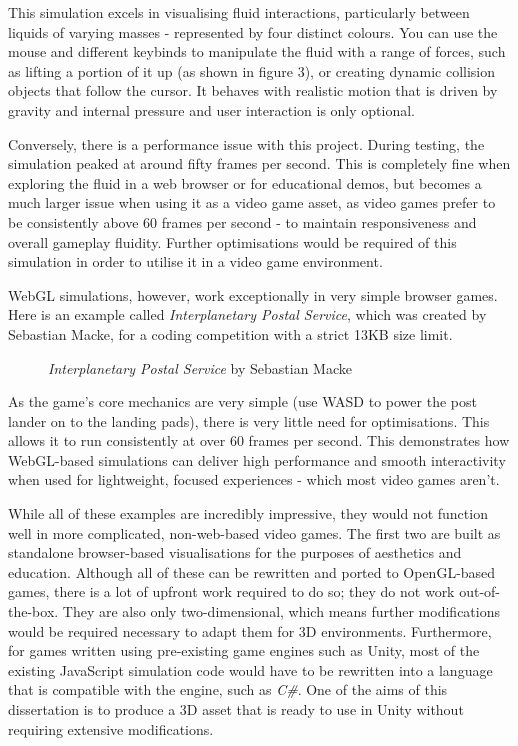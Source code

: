 \documentclass[12pt]{article}
\newcommand{\wideimage}[2][]{%
  \makebox[\textwidth][c]{\texttt{[image: \#2]}}%
}
\begin{document}
    This simulation excels in visualising fluid interactions, particularly between liquids of varying masses - represented by four distinct colours. You can use the mouse and different keybinds to manipulate the fluid with a range of forces, such as lifting a portion of it up (as shown in figure 3), or creating dynamic collision objects that follow the cursor. It behaves with realistic motion that is driven by gravity and internal pressure and user interaction is only optional.

    Conversely, there is a performance issue with this project. During testing, the simulation peaked at around fifty frames per second. This is completely fine when exploring the fluid in a web browser or for educational demos, but becomes a much larger issue when using it as a video game asset, as video games prefer to be consistently above 60 frames per second - to maintain responsiveness and overall gameplay fluidity. Further optimisations would be required of this simulation in order to utilise it in a video game environment.

    WebGL simulations, however, work exceptionally in very simple browser games. Here is an example called \textit{Interplanetary Postal Service}\cite{ips}, which was created by Sebastian Macke, for a coding competition with a strict 13KB size limit.

    \begin{figure}[H]
        \noindent\wideimage[]{webGLIPS.png}
        \caption{\textit{Interplanetary Postal Service} by Sebastian Macke \cite{ips}}
    \end{figure}

    As the game's core mechanics are very simple (use WASD to power the post lander on to the landing pads), there is very little need for optimisations. This allows it to run consistently at over 60 frames per second. This demonstrates how WebGL-based simulations can deliver high performance and smooth interactivity when used for lightweight, focused experiences - which most video games aren't.

    While all of these examples are incredibly impressive, they would not function well in more complicated, non-web-based video games. The first two are built as standalone browser-based visualisations for the purposes of aesthetics and education. Although all of these can be rewritten and ported to OpenGL-based games, there is a lot of upfront work required to do so; they do not work out-of-the-box. They are also only two-dimensional, which means further modifications would be required necessary to adapt them for 3D environments. Furthermore, for games written using pre-existing game engines such as Unity, most of the existing JavaScript simulation code would have to be rewritten into a language that is compatible with the engine, such as \textit{C\#}. One of the aims of this dissertation is to produce a 3D asset that is ready to use in Unity without requiring extensive modifications.
\end{document}
